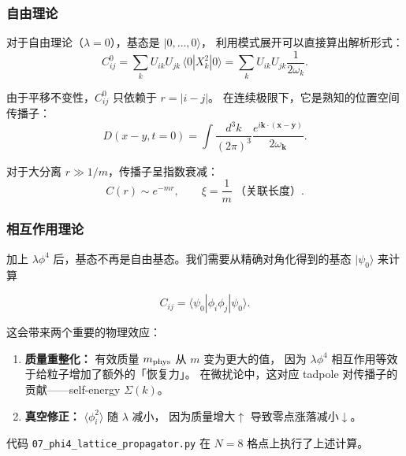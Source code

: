 \documentclass[12pt,a4paper]{article}
\begin{document}
\subsubsection*{自由理论}

对于自由理论（$\lambda=0$），基态是 $|0,\ldots,0\rangle$，
利用模式展开可以直接算出解析形式：
\begin{equation}
C_{ij}^0 = \sum_k U_{ik} U_{jk} \, \langle 0| X_k^2 |0\rangle
= \sum_k U_{ik} U_{jk} \frac{1}{2\omega_k}.
\label{eq:prop-free}
\end{equation}

由于平移不变性，$C_{ij}^0$ 只依赖于 $r = |i-j|$。
在连续极限下，它是熟知的位置空间传播子：
\begin{equation}
D(x-y, t=0) = \int \frac{d^3k}{(2\pi)^3} \frac{e^{i\mathbf{k}\cdot(\mathbf{x}-\mathbf{y})}}{2\omega_{\mathbf{k}}}.
\label{eq:prop-continuum}
\end{equation}

对于大分离 $r \gg 1/m$，传播子呈指数衰减：
\begin{equation}
C(r) \sim e^{-m r},
\qquad \xi = \frac{1}{m}\ \text{（关联长度）}.
\label{eq:prop-decay}
\end{equation}

\subsubsection*{相互作用理论}

加上 $\lambda\phi^4$ 后，基态不再是自由基态。我们需要从精确对角化得到的基态 $|\psi_0\rangle$ 来计算

\begin{equation}
C_{ij} = \langle\psi_0| \phi_i \phi_j |\psi_0\rangle.
\label{eq:prop-exact}
\end{equation}

这会带来两个重要的物理效应：
\begin{enumerate}[nosep]
\item \textbf{质量重整化：} 有效质量 $m_{\rm phys}$ 从 $m$ 变为更大的值，
因为 $\lambda\phi^4$ 相互作用等效于给粒子增加了额外的「恢复力」。
在微扰论中，这对应 tadpole 对传播子的贡献——self-energy $\Sigma(k)$。

\item \textbf{真空修正：} $\langle\phi_i^2\rangle$ 随 $\lambda$ 减小，
因为质量增大$\uparrow$ 导致零点涨落减小$\downarrow$。
\end{enumerate}

代码 \texttt{07\_phi4\_lattice\_propagator.py} 在 $N=8$ 格点上执行了上述计算。
\end{document}
